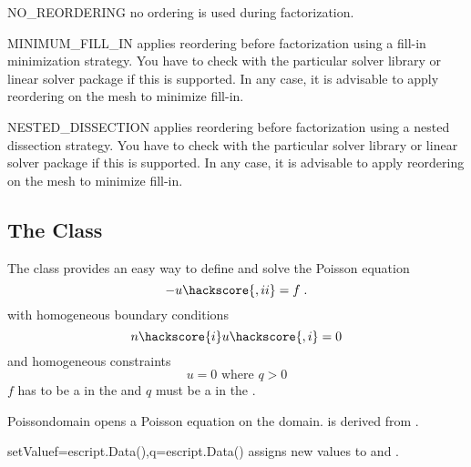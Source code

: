 \begin{memberdesc}[LinearPDE]{NO_REORDERING}
no ordering is used during factorization.
\end{memberdesc}

\begin{memberdesc}[LinearPDE]{MINIMUM_FILL_IN}
applies reordering before factorization using a fill-in minimization strategy. You have to check with the particular solver library or
linear solver package if this is supported. In any case, it is advisable to apply reordering on the mesh to minimize fill-in.
\end{memberdesc}

\begin{memberdesc}[LinearPDE]{NESTED_DISSECTION}
applies reordering before factorization using a nested dissection strategy. You have to check with the particular solver library or
linear solver package if this is supported. In any case, it is advisable to apply reordering on the mesh to minimize fill-in.
\end{memberdesc}

\subsection{The \Poisson Class}
The \Poisson class provides an easy way to define and solve the Poisson
equation
\begin{equation}\label{POISSON.1}
-u\hackscore{,ii}=f\; .
\end{equation}
with homogeneous boundary conditions
\begin{equation}\label{POISSON.2}
n\hackscore{i}u\hackscore{,i}=0
\end{equation}
and homogeneous constraints
\begin{equation}\label{POISSON.3}
u=0 \mbox{ where } q>0
\end{equation}
$f$ has to be a \Scalar in the \Function and $q$ must be
a \Scalar in  the \SolutionFS.

\begin{classdesc}{Poisson}{domain}
opens a Poisson equation on the \Domain domain. \Poisson is derived from \LinearPDE.
\end{classdesc}
\begin{methoddesc}[Poisson]{setValue}{f=escript.Data(),q=escript.Data()}
assigns new values to  and .
\end{methoddesc}

